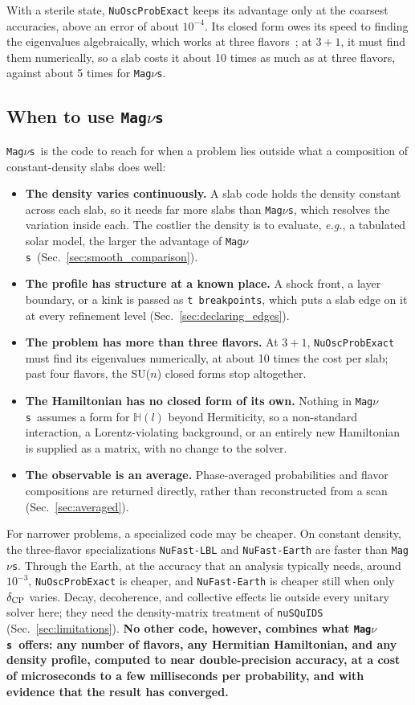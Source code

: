 \documentclass[final,5p,times,twocolumn,sort,compress]{elsarticle}
\makeatletter
\newcommand{\eg}{{\it e.g.}}
\DeclareRobustCommand{\_}{%
  \ifmmode\nfss@text{\textunderscore}\else\textunderscore\allowbreak\fi}
\newcommand{\magnus}{{\tt Mag}\ensuremath{\nu}{\tt s}}
\makeatother
\begin{document}
With a sterile state, {\tt NuOscProbExact} keeps its advantage only at the coarsest accuracies, above an error of about $10^{-4}$. Its closed form owes its speed to finding the eigenvalues algebraically, which works at three flavors\ \cite{Bustamante:2019ggq}; at $3+1$, it must find them numerically, so a slab costs it about 10 times as much as at three flavors, against about 5 times for \magnus.


\subsection{When to use \magnus}
\label{sec:when_magnus}

\magnus\ is the code to reach for when a problem lies outside what a composition of constant-density slabs does well:
\begin{itemize}
\item \textbf{The density varies continuously.} A slab code holds the density constant across each slab, so it needs far more slabs than \magnus, which resolves the variation inside each. The costlier the density is to evaluate, \eg, a tabulated solar model, the larger the advantage of \magnus\ (Sec.~\ref{sec:smooth_comparison}).
\item \textbf{The profile has structure at a known place.} A shock front, a layer boundary, or a kink is passed as {\tt t\_breakpoints}, which puts a slab edge on it at every refinement level (Sec.~\ref{sec:declaring_edges}).
\item \textbf{The problem has more than three flavors.} At $3+1$, {\tt NuOscProbExact} must find its eigenvalues numerically, at about 10 times the cost per slab; past four flavors, the SU($n$) closed forms stop altogether.
\item \textbf{The Hamiltonian has no closed form of its own.} Nothing in \magnus\ assumes a form for $\mathbb{H}(l)$ beyond Hermiticity, so a non-standard interaction, a Lorentz-violating background, or an entirely new Hamiltonian is supplied as a matrix, with no change to the solver.
\item \textbf{The observable is an average.} Phase-averaged probabilities and flavor compositions are returned directly, rather than reconstructed from a scan (Sec.~\ref{sec:averaged}).
\end{itemize}

For narrower problems, a specialized code may be cheaper. On constant density, the three-flavor specializations {\tt NuFast-LBL} and {\tt NuFast-Earth} are faster than \magnus. Through the Earth, at the accuracy that an analysis typically needs, around $10^{-3}$, {\tt NuOscProbExact} is cheaper, and {\tt NuFast-Earth} is cheaper still when only $\delta_{\rm CP}$ varies. Decay, decoherence, and collective effects lie outside every unitary solver here; they need the density-matrix treatment of {\tt nuSQuIDS} (Sec.~\ref{sec:limitations}). \textbf{No other code, however, combines what \magnus\ offers: any number of flavors, any Hermitian Hamiltonian, and any density profile, computed to near double-precision accuracy, at a cost of microseconds to a few milliseconds per probability, and with evidence that the result has converged.}
\end{document}
